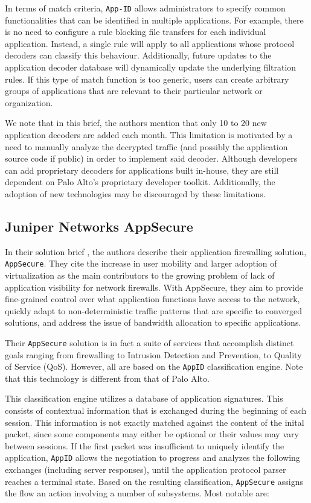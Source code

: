 In terms of match criteria, \texttt{App-ID} allows administrators to specify
common functionalities that can be identified in multiple applications. For
example, there is no need to configure a rule blocking file transfers for each
individual application. Instead, a single rule will apply to all applications
whose protocol decoders can classify this behaviour. Additionally, future updates
to the application decoder database will dynamically update the underlying
filtration rules. If this type of match function is too generic, users can create
arbitrary groups of applications that are relevant to their particular network or
organization.

We note that in this brief, the authors mention that only 10 to 20 new application
decoders are added each month. This limitation is motivated by a need to manually
analyze the decrypted traffic (and possibly the application source code if public)
in order to implement said decoder. Although developers can add proprietary decoders
for applications built in-house, they are still dependent on Palo Alto's
proprietary developer toolkit. Additionally, the adoption of new technologies
may be discouraged by these limitations.

\subsection{Juniper Networks AppSecure}

In their solution brief \cite{juniper2020appsecure}, the authors describe their
application firewalling solution, \texttt{AppSecure}. They cite the increase in
user mobility and larger adoption of virtualization as the main contributors
to the growing problem of lack of application visibility for network firewalls.
With AppSecure, they aim to provide fine-grained control over what application
functions have access to the network, quickly adapt to non-deterministic traffic
patterns that are specific to converged solutions, and address the issue of
bandwidth allocation to specific applications.

Their \texttt{AppSecure} solution is in fact a suite of services that accomplish
distinct goals ranging from firewalling to Intrusion Detection and Prevention,
to Quality of Service (QoS). However, all are based on the \texttt{AppID}
classification engine. Note that this technology is different from that of Palo Alto.

This classification engine utilizes a database of application signatures. This
consists of contextual information that is exchanged during the beginning of
each session. This information is not exactly matched against the content of
the inital packet, since some components may either be optional or their values
may vary between sessions. If the first packet was insufficient to uniquely
identify the application, \texttt{AppID} allows the negotiation to progress and
analyzes the following exchanges (including server responses), until the
application protocol parser reaches a terminal state. Based on the resulting
classification, \texttt{AppSecure} assigns the flow an action involving a number
of subsystems. Most notable are:

